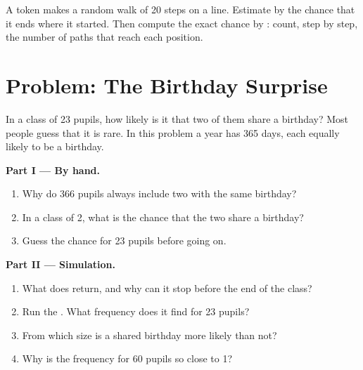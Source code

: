 \begin{exercise}[$\star\star\star$]\label{exo:g9:randomness-and-simulation:12}
A token makes a random walk of 20 steps on a line. Estimate by  the
chance that it ends where it started. Then compute the exact chance by :
count, step by step, the number of paths that reach each position.
\end{exercise}

\section{Problem: The Birthday Surprise}

\begin{problem}\label{pb:g9:randomness-and-simulation:1}
In a class of 23 pupils, how likely is it that two of them share a birthday? Most
people guess that it is rare. In this problem a year has 365 days, each equally
likely to be a birthday.

\medskip\noindent\textbf{Part I --- By hand.}
\begin{enumerate}
  \item Why do 366 pupils always include two with the same birthday?
  \item In a class of 2, what is the chance that the two share a birthday?
  \item Guess the chance for 23 pupils before going on.
\end{enumerate}

\medskip\noindent\textbf{Part II --- Simulation.}

\label{lst:g9:randomness-and-simulation:birthday}

\begin{enumerate}[resume]
  \item What does  return, and why can it stop before the end of the
    class?
  \item Run the . What frequency does it find for 23 pupils?
  \item From which size is a shared birthday more likely than not?
  \item Why is the frequency for 60 pupils so close to 1?
\end{enumerate}


\end{problem}
